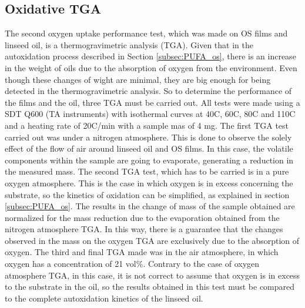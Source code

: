 \begin{refsection}
\subsection{Oxidative TGA}
The second oxygen uptake performance test, which was made on OS films and linseed oil, is a thermogravimetric analysis (TGA). Given that in the autoxidation process described in Section \ref{subsec:PUFA_os}, there is an increase in the weight of oils due to the absorption of oxygen from the environment. Even though these changes of wight are minimal, they are big enough for being detected in the thermogravimetric analysis. So to determine the performance of the films and the oil, three TGA must be carried out. All tests were made using a SDT Q600 (TA instruments) with isothermal curves at 40\degree C, 60\degree C, 80\degree C and 110\degree C and a heating rate of 20\degree C/min with a sample mas of 4 mg.  The first TGA test carried out was under a nitrogen atmosphere. This is done to observe the solely effect of the flow of air around linseed oil and OS films. In this case, the volatile components within the sample are going to evaporate, generating a reduction in the measured mass. The second TGA test, which has to be carried is in a pure oxygen atmosphere. This is the case in which oxygen is in excess concerning the substrate, so the kinetics of oxidation can be simplified, as explained in section \ref{subsec:PUFA_os}. The results in the change of mass of the sample obtained are normalized for the mass reduction due to the evaporation obtained from the nitrogen atmosphere TGA. In this way, there is a guarantee that the changes observed in the mass on the oxygen TGA are exclusively due to the absorption of oxygen. The third and final TGA made was in the air atmosphere, in which oxygen has a concentration of 21 vol\%. Contrary to the case of oxygen atmosphere TGA, in this case, it is not correct to assume that oxygen is in excess to the substrate in the oil, so the results obtained in this test must be compared to the complete autoxidation kinetics of the linseed oil.   


\end{refsection}
